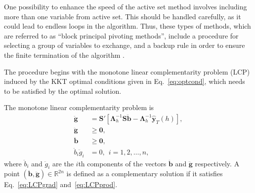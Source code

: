 \documentclass[11pt]{article}
\newcommand{\0}{\phantom{0}}
\begin{document}

One possibility to enhance the speed of the active set method involves including more than one variable from active set. This should be handled carefully, as it could lead to endless loops in the algorithm. Thus, these types of methods, which are referred to  as ``block principal pivoting methods'', include a procedure for selecting a group of variables to exchange, and a backup rule in order to ensure the finite termination of the algorithm \citep{Judice1994}. 

The procedure begins with the monotone linear complementarity problem (LCP) induced by the KKT optimal conditions given in Eq.~\eqref{eq:optcond}, which needs to be satisfied by the optimal solution.

The monotone linear complementarity problem is
\begin{align}
\ddot{\bm{g}} & = \bm{S}'[\bm{\Lambda}_{h}^{-1}\bm{S}\ddot{\bm{b}} - \bm{\Lambda}_{h}^{-1}\hat{\bm{y}}_{T}(h)],\label{eq:LCPgrad}\\
\ddot{\bm{g}} & \geq \bm{0}, \label{eq:LCPg}\\
\ddot{\bm{b}} & \geq \bm{0}, \label{eq:LCPb}\\
\ddot{b}_{i}\ddot{g}_{i} & = 0, \ \ i = 1, 2, \dots, n\label{eq:LCPprod},
\end{align}
where $\ddot{b}_{i}$ and $\ddot{g}_{i}$ are the $i$th components of the vectors $\ddot{\bm{b}}$ and $\ddot{\bm{g}}$ respectively. A point $(\ddot{\bm{b}}, \ddot{\bm{g}}) \in \mathbb{R}^{2n}$ is defined as a complementary solution if it satisfies Eq.~\eqref{eq:LCPgrad} and~\eqref{eq:LCPprod}.
\end{document}
